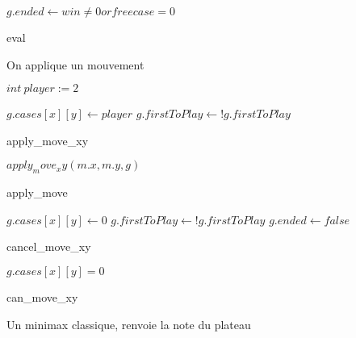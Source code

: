 \documentclass[8pt]{article}
\begin{document}
\begin{algorithm}[H]
{{                            }}


$g.ended \leftarrow win \neq 0 or freecase = 0 $\;
\caption{eval}
\end{algorithm}
 On applique un mouvement 
\begin{algorithm}[H]
$int\:player := 2$\;

$g.cases[x][y] \leftarrow player $\;
$g.firstToPlay \leftarrow !g.firstToPlay $\;
\caption{apply\_move\_xy}
\end{algorithm}
\begin{algorithm}[H]
$apply_move_xy(m.x, m.y, g)$\;
\caption{apply\_move}
\end{algorithm}
\begin{algorithm}[H]
$g.cases[x][y] \leftarrow 0 $\;
$g.firstToPlay \leftarrow !g.firstToPlay $\;
$g.ended \leftarrow false $\;
\caption{cancel\_move\_xy}
\end{algorithm}
\begin{algorithm}[H]
\Return $ g.cases[x][y] = 0 $\;
\caption{can\_move\_xy}
\end{algorithm}

Un minimax classique, renvoie la note du plateau
\end{document}
